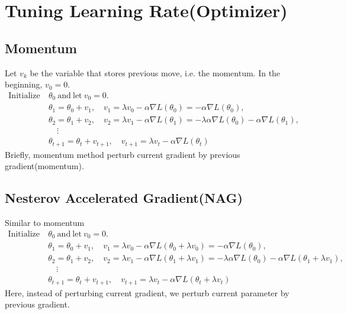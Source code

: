 \documentclass{article}
\begin{document}
    \section{Tuning Learning Rate(Optimizer)}
        \subsection{Momentum}
            Let $v_k$ be the variable that stores previous move, i.e. the momentum. In the beginning, $v_0=0$.
            \begin{align*}
                \mathrm{Initialize~} & \theta_0 \mathrm{~and~let~} v_0=0. \\
                & \theta_1 = \theta_0 + v_1,\quad v_1 = \lambda v_0 - \alpha \nabla L(\theta_0)=- \alpha \nabla L(\theta_0), \\
                & \theta_2 = \theta_1 + v_2,\quad v_2 = \lambda v_1 - \alpha \nabla L(\theta_1)=-\lambda\alpha \nabla L(\theta_0)- \alpha \nabla L(\theta_1), \\
                         &\quad \vdots\\
                & \theta_{t+1} = \theta_{t} + v_{t+1},\quad v_{t+1} = \lambda v_{t} - \alpha \nabla L(\theta_{t})
            \end{align*}
            Briefly, momentum method perturb current gradient by previous gradient(momentum).

        \subsection{Nesterov Accelerated Gradient(NAG)}
            Similar to momentum
            \begin{align*}
                \mathrm{Initialize~} & \theta_0 \mathrm{~and~let~} v_0 = 0. \\
                & \theta_1 = \theta_0 + v_1, \quad v_1 = \lambda v_0 - \alpha \nabla L(\theta_0 + \lambda v_0) = -\alpha \nabla L(\theta_0), \\
                & \theta_2 = \theta_1 + v_2, \quad v_2 = \lambda v_1 - \alpha \nabla L(\theta_1 + \lambda v_1) = -\lambda \alpha \nabla L(\theta_0) - \alpha \nabla L(\theta_1 + \lambda v_1), \\
                         &\quad \vdots\\
                & \theta_{t+1} = \theta_t + v_{t+1}, \quad v_{t+1} = \lambda v_t - \alpha \nabla L(\theta_t + \lambda v_t)
            \end{align*}
            Here, instead of perturbing current gradient, we perturb current parameter by previous gradient.
            
\end{document}
